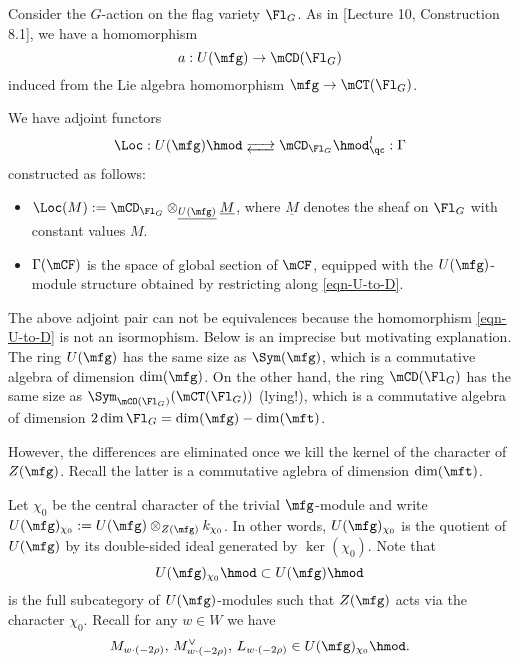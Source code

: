 	Consider the $G$-action on the flag variety $\Fl_G$. As in [Lecture 10, Construction 8.1], we have a homomorphism
	\begin{equation}
		\label{eqn-U-to-D}
		a: U(\mfg) \to \mCD(\Fl_G)
	\end{equation}
	induced from the Lie algebra homomorphism $\mfg \to \mCT(\Fl_G)$.

	\begin{constr}
		We have adjoint functors
		\begin{equation}
			\label{eqn-loc-gamma}
			\Loc: U(\mfg)\hmod \adj \mCD_{\Fl_G}\hmod_\qc^l : \Gamma
		\end{equation}
		constructed as follows:
		\begin{itemize}
			\item 
				$\Loc(M):=  \mCD_{\Fl_G}\ot_{\underline{U(\mfg)}} \underline{M}$, where $\underline{M}$ denotes the sheaf on $\Fl_G$ with constant values $M$.
			\item
				$\Gamma(\mCF)$ is the space of global section of $\mCF$, equipped with the $U(\mfg)$-module structure obtained by restricting along \eqref{eqn-U-to-D}.
		\end{itemize}
	\end{constr}

	\begin{rem}
		The above adjoint pair can not be equivalences because the homomorphism \eqref{eqn-U-to-D} is not an isormophism. Below is an imprecise but motivating explanation. The ring $U(\mfg)$ has the same size as $\Sym(\mfg)$, which is a commutative algebra of dimension $\dim(\mfg)$. On the other hand, the ring $\mCD(\Fl_G)$ has the same size as $\Sym_{\mCO(\Fl_G)}(\mCT(\Fl_G))$ (lying!), which is a commutative algebra of dimension $2\dim \Fl_G = \dim(\mfg)-\dim(\mft)$.
	\end{rem}

	However, the differences are eliminated once we kill the kernel of the character of $Z(\mfg)$. Recall the latter is a commutative aglebra of dimension $\dim(\mft)$.

	\begin{constr}
		Let $\chi_0$ be the central character of the trivial $\mfg$-module and write $U(\mfg)_{\chi_0}:= U(\mfg) \ot_{Z(\mfg)} k_{\chi_0}$. In other words, $U(\mfg)_{\chi_0}$ is the quotient of $U(\mfg)$ by its double-sided ideal generated by $\ker(\chi_0)$. Note that 
		\[
			U(\mfg)_{\chi_0}\hmod  \subset U(\mfg)\hmod
		\]
		is the full subcategory of $U(\mfg)$-modules such that $Z(\mfg)$ acts via the character $\chi_0$. Recall for any $w\in W$ we have
		\[
			M_{w\cdot (-2\rho)}, \,M_{w\cdot (-2\rho)}^\vee, \,L_{w\cdot (-2\rho)} \in U(\mfg)_{\chi_0}\hmod.
		\]
	\end{constr}

